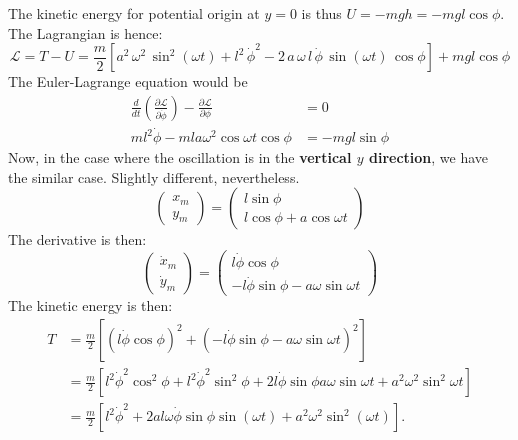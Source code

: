 The kinetic energy for potential origin at $y=0$ is thus $U=-mgh = -mgl \cos{\phi}$. The Lagrangian is hence: 
\begin{equation}
    \mathcal{L} = T - U = \frac{m}{2}\left[
            a^{2}\,\omega^{2}\,\sin^{2}(\omega t)
            + l^{2}\,\dot{\phi}^{2}
            - 2\,a\,\omega\,l\,\dot{\phi}\,\sin(\omega t)\,\cos\phi
        \right] + mgl \cos{\phi}
\end{equation}
The Euler-Lagrange equation would be 
\begin{align}
    \frac{d}{dt}\left(\frac{\partial \mathcal{L}}{\partial \dot{\phi}}\right) - \frac{\partial \mathcal{L}}{\partial \phi} &= 0\\
    ml^{2}\dot{\phi} - ml a\omega^{2} \cos{\omega t}\cos{\phi}& = -mgl \sin{\phi}
\end{align}
Now, in the case where the oscillation is in the \textbf{vertical $y$ direction}, we have the similar case. Slightly different, nevertheless. 
\begin{equation}
    \begin{pmatrix}
        x_{m}\\
        y_{m}
    \end{pmatrix}
    = 
    \begin{pmatrix}
        l\sin{\phi}\\
        l\cos{\phi} + a\cos{\omega t}
    \end{pmatrix}
\end{equation}
The derivative is then:
\begin{equation}
    \begin{pmatrix}
        \dot{x}_{m} \\
        \dot{y}_{m}
    \end{pmatrix}
    = 
    \begin{pmatrix}
        l\dot{\phi} \cos{\phi}\\
        - l \dot{\phi} \sin{\phi} - a\omega\sin{\omega t}
    \end{pmatrix}
\end{equation}
The kinetic energy is then: 
\begin{equation}
    \begin{split}
        T 
        & = \frac{m}{2} \left[ \left(l \dot{\phi}\cos{\phi}\right)^{2} + \left(- l \dot{\phi} \sin{\phi} - a\omega\sin{\omega t}\right)^{2} \right]\\
        & = \frac{m}{2} \left[ l^{2} \dot{\phi}^{2} \cos^{2}{\phi}+ l^{2}\dot{\phi}^{2}\sin^{2}{\phi}+ 2l\dot{\phi}\sin{\phi}a\omega\sin{\omega t}+ a^{2}\omega^{2}\sin^{2}{\omega t} \right]\\
        &= \frac{m}{2} \left[ l^{2}\dot{\phi}^{2} + 2 a l \omega \dot{\phi} \sin\phi \sin\left(\omega t\right) + a^{2} \omega^{2} \sin^{2}\left(\omega t\right) \right].
    \end{split}
\end{equation}
